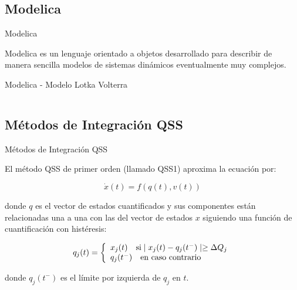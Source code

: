 \documentclass[10pt,presentation]{beamer}
\begin{document}
	\subsection{Modelica}

\begin{frame}{Modelica}
	\begin{block}{Modelica}
es un lenguaje orientado a objetos desarrollado para describir de manera sencilla modelos de sistemas dinámicos eventualmente muy complejos.
	
\end{block}
\end{frame}

\begin{frame}[fragile]{Modelica - Modelo Lotka Volterra}
\begin{center}
\begin{figure}[H]    
	\inputminted[linenos]{modelica}{src/LotkaVolterra.mo}
\end{figure}
\end{center}
\end{frame}

	\subsection{Métodos de Integración QSS}

\begin{frame}{Métodos de Integración QSS}
\begin{block}{El método QSS}
	de primer orden (llamado QSS1) aproxima la ecuación por:
	
	\begin{equation*}
	\dot{x}(t) = f (q(t), v(t))
	\end{equation*}
	
	donde $q$ es el vector de estados cuantificados y sus componentes están relacionadas una a una con las del vector de estados $x$ siguiendo una 
	función de cuantificación con histéresis:
	
	\begin{equation*}
	q_j(t) = \left\{ 
	  \begin{array}{l l}
	    x_j(t)  \quad \text{si} \mid x_j (t ) - q_j (t^{-} ) \mid \geq \Delta Q_j \\
	    q_j (t^{-} ) \quad \text{en caso contrario}
	  \end{array} \right.
	\end{equation*}
	
	donde $q_j (t^{-})$ es el límite por izquierda de $q_j$ en $t$.
\end{block}
\end{frame}
\end{document}
